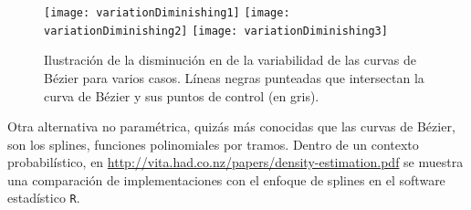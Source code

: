 \begin{figure}[H]
	\centering
		\texttt{[image: variationDiminishing1]}
		\qquad
		\texttt{[image: variationDiminishing2]}
		\qquad
		\texttt{[image: variationDiminishing3]}
		\label{fig:variationDiminishing3}
		\caption{Ilustraci\'on de la disminuci\'on en de la variabilidad de las curvas de B\'ezier para varios casos. L\'ineas negras punteadas que intersectan la curva de B\'ezier y sus puntos de control (en gris).}
	\label{fig:BezierPropVarDimi}
\end{figure}

Otra alternativa no param\'etrica, quiz\'as m\'as conocidas que las curvas de B\'ezier, son los splines, funciones polinomiales por tramos. Dentro de un contexto probabil\'istico, en \url{http://vita.had.co.nz/papers/density-estimation.pdf} se muestra una comparaci\'on de implementaciones con el enfoque de splines en el software estad\'istico \verb|R|.
